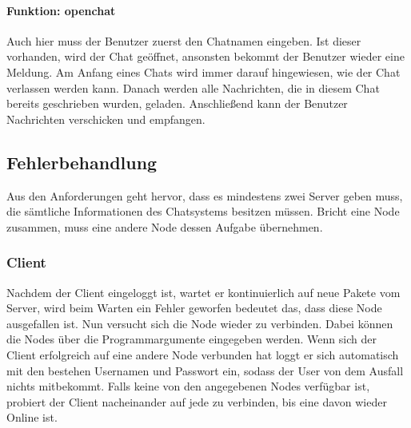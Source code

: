 \paragraph{Funktion: openchat}
Auch hier muss der Benutzer zuerst den Chatnamen eingeben. Ist dieser vorhanden, wird der Chat geöffnet, ansonsten
bekommt der Benutzer wieder eine Meldung. Am Anfang eines Chats wird immer darauf hingewiesen, wie der Chat
verlassen werden kann. Danach werden alle Nachrichten, die in diesem Chat bereits geschrieben wurden, geladen.
Anschließend kann der Benutzer Nachrichten verschicken und empfangen.

\author{Matthias Vonend, Aaron Schweig, Troy Keßler}
\subsection{Fehlerbehandlung}
Aus den Anforderungen geht hervor, dass es mindestens zwei Server geben muss, die sämtliche Informationen des
Chatsystems besitzen müssen. Bricht eine Node zusammen, muss eine andere Node dessen Aufgabe übernehmen.

\subsubsection{Client}
Nachdem der Client eingeloggt ist, wartet er kontinuierlich auf neue Pakete vom Server, wird beim Warten ein Fehler geworfen bedeutet das, dass diese Node ausgefallen ist. Nun versucht sich die Node wieder zu verbinden. Dabei können die Nodes über die Programmargumente eingegeben werden. Wenn sich der Client erfolgreich auf eine andere Node verbunden hat loggt er sich automatisch mit den bestehen Usernamen und Passwort ein, sodass der User von dem Ausfall nichts mitbekommt. Falls keine von den angegebenen Nodes verfügbar ist, probiert der Client nacheinander auf jede zu verbinden, bis eine davon wieder Online ist.

